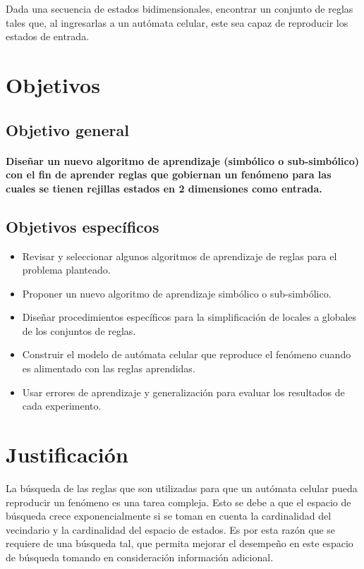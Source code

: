Dada una secuencia de estados bidimensionales, encontrar un conjunto de reglas tales que, al ingresarlas a un autómata celular, este sea capaz de reproducir los estados de entrada.

\section{Objetivos}
%
\subsection{Objetivo general}
\noindent \paragraph{Diseñar un nuevo algoritmo de aprendizaje (simbólico o sub-simbólico) con el fin de aprender reglas que gobiernan un fenómeno para las cuales se tienen rejillas estados en 2 dimensiones como entrada.}

\subsection{Objetivos específicos}
\begin{itemize}
\item Revisar y seleccionar algunos algoritmos de aprendizaje de reglas para el problema planteado.
\item Proponer un nuevo algoritmo de aprendizaje simbólico o sub-simbólico.
\item Diseñar procedimientos específicos para la simplificación de locales a globales de los conjuntos de reglas.
\item Construir el modelo de autómata celular que reproduce el fenómeno cuando es alimentado con las reglas aprendidas.
\item Usar errores de aprendizaje y generalización para evaluar los resultados de cada experimento. 
\end{itemize}

\section{Justificación}
La búsqueda de las reglas que son utilizadas para que un autómata celular pueda reproducir un fenómeno es una tarea compleja. Esto se debe a que el espacio de búsqueda crece exponencialmente si se toman en cuenta la cardinalidad del vecindario y la cardinalidad del espacio de estados. Es por esta razón que se requiere de una búsqueda tal, que permita mejorar el desempeño en este espacio de búsqueda tomando en consideración información adicional.

